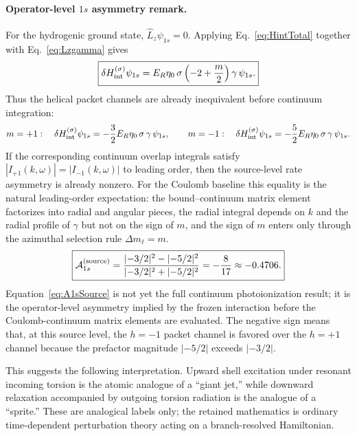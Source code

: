 \documentclass[11pt,a4paper]{article}
\begin{document}
\paragraph{Operator-level $1s$ asymmetry remark.}
For the hydrogenic ground state, $\hat L_z\psi_{1s}=0$. Applying Eq.~\eqref{eq:HintTotal} together with Eq.~\eqref{eq:Lzgamma} gives
\begin{equation}
\label{eq:Hint1s}
\boxed{
\delta H_{\rm int}^{(\sigma)}\psi_{1s}
=
E_R\eta_0\,\sigma\left(-2+\frac{m}{2}\right)\gamma\,\psi_{1s}.
}
\end{equation}
Thus the helical packet channels are already inequivalent before continuum integration:
\begin{equation}
\label{eq:Hint1sPm}
 m=+1:\quad \delta H_{\rm int}^{(\sigma)}\psi_{1s}=-\frac{3}{2}E_R\eta_0\,\sigma\,\gamma\,\psi_{1s},
 \qquad
 m=-1:\quad \delta H_{\rm int}^{(\sigma)}\psi_{1s}=-\frac{5}{2}E_R\eta_0\,\sigma\,\gamma\,\psi_{1s}.
\end{equation}
If the corresponding continuum overlap integrals satisfy $|I_{+1}(k,\omega)|=|I_{-1}(k,\omega)|$ to leading order, then the source-level rate asymmetry is already nonzero. For the Coulomb baseline this equality is the natural leading-order expectation: the bound--continuum matrix element factorizes into radial and angular pieces, the radial integral depends on $k$ and the radial profile of $\gamma$ but not on the sign of $m$, and the sign of $m$ enters only through the azimuthal selection rule $\Delta m_\ell=m$.
\begin{equation}
\label{eq:A1sSource}
\boxed{
\mathcal A_{1s}^{\rm(source)}
=
\frac{|{-3}/{2}|^2-|{-5}/{2}|^2}{|{-3}/{2}|^2+|{-5}/{2}|^2}
=
-\frac{8}{17}
\approx -0.4706.
}
\end{equation}
Equation~\eqref{eq:A1sSource} is not yet the full continuum photoionization result; it is the operator-level asymmetry implied by the frozen interaction before the Coulomb-continuum matrix elements are evaluated. The negative sign means that, at this source level, the $h=-1$ packet channel is favored over the $h=+1$ channel because the prefactor magnitude $|{-5}/{2}|$ exceeds $|{-3}/{2}|$.

This suggests the following interpretation. Upward shell excitation under resonant incoming torsion is the atomic analogue of a ``giant jet,'' while downward relaxation accompanied by outgoing torsion radiation is the analogue of a ``sprite.'' These are analogical labels only; the retained mathematics is ordinary time-dependent perturbation theory acting on a branch-resolved Hamiltonian.
\end{document}
